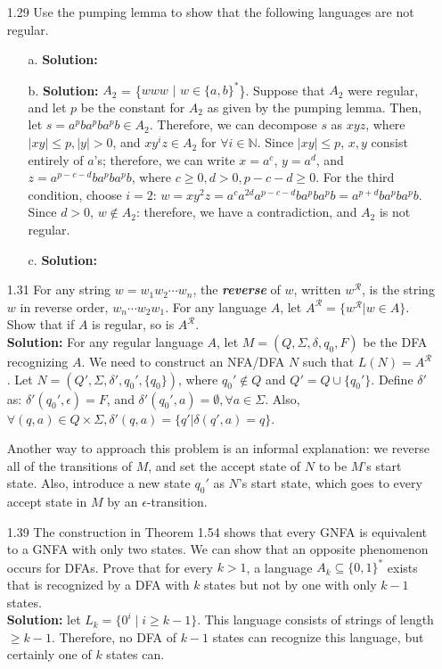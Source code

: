 \begin{enumerate}
\item[1.29]Use the pumping lemma to show that the following languages are not regular.
\begin{enumerate}
\item[a.]\textbf{Solution:} \alreadyanswered
\item[b.]\textbf{Solution:} $A_2$ = \{$www$ $|$ $w \in \{a, b\}^*$\}. Suppose that $A_2$ were regular, and let $p$ be the constant for $A_2$ as given by the pumping lemma. Then, let $s = a^{p}ba^{p}ba^{p}b \in A_2$. Therefore, we can decompose $s$ as $xyz$, where $|xy| \le p, |y| > 0$, and $xy^iz \in A_2$ for $\forall i \in \mathbb{N}$. Since $|xy| \le p$, $x, y$ consist entirely of $a$'s; therefore, we can write $x = a^c$, $y = a^d$, and $z = a^{p-c-d}ba^{p}ba^{p}b$, where $c \ge 0, d > 0, p-c-d \ge 0$. For the third condition, choose $i = 2$: $w = xy^{2}z = a^{c}a^{2d}a^{p-c-d}ba^{p}ba^{p}b = a^{p+d}ba^{p}ba^{p}b$. Since $d > 0$, $w \notin A_2$: therefore, we have a contradiction, and $A_2$ is not regular.
\item[c.]\textbf{Solution:} \alreadyanswered
\end{enumerate}

\item[1.31]For any string $w = w_{1}w_{2}\cdots w_{n}$, the \textbf{\emph{reverse}} of $w$, written $w^{\mathcal{R}}$, is the string $w$ in reverse order, $w_n\cdots w_{2}w_{1}$. For any language $A$, let $A^{\mathcal{R}} = \{w^{\mathcal{R}} | w \in A\}$. Show that if $A$ is regular, so is $A^{\mathcal{R}}$. 
\\
\textbf{Solution:} For any regular language $A$, let $M = (Q, \Sigma, \delta, q_0, F)$ be the DFA recognizing $A$. We need to construct an NFA/DFA $N$ such that $L(N) = A^{\mathcal{R}}$. Let $N = (Q', \Sigma, \delta', q_0', \{q_0\})$, where $q_0' \notin Q$ and $Q' = Q \cup \{q_0'\}$. Define $\delta'$ as: $\delta'(q_0', \epsilon) = F$, and $\delta'(q_0', a) = \emptyset, \forall a \in \Sigma$. Also, $\forall (q, a) \in Q \times \Sigma, \delta'(q, a) = \{q' | \delta(q', a) = q\}$. 

\par Another way to approach this problem is an informal explanation: we reverse all of the transitions of $M$, and set the accept state of $N$ to be $M$'s start state. Also, introduce a new state $q_0'$ as $N$'s start state, which goes to every accept state in $M$ by an $\epsilon$-transition.

\item[1.39]The construction in Theorem 1.54 shows that every GNFA is equivalent to a GNFA with only two states. We can show that an opposite phenomenon occurs for DFAs. Prove that for every $k > 1$, a language $A_k \subseteq \{0,1\}^*$ exists that is recognized by a DFA with $k$ states but not by one with only $k-1$ states.
\\
\textbf{Solution:} let $L_k = \{0^i\;\vert\;i \ge k-1\}$. This language consists of strings of length $\ge k-1$. Therefore, no DFA of $k-1$ states can recognize this language, but certainly one of $k$ states can.


\end{enumerate}
